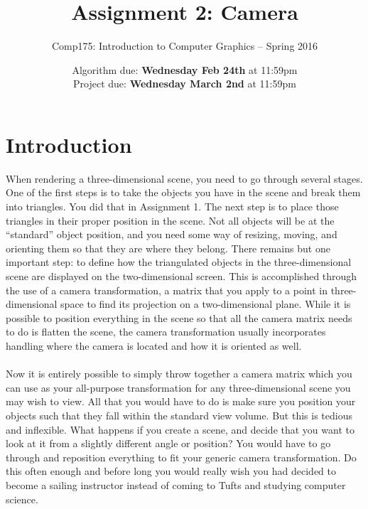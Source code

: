 \documentclass[10pt,twocolumn]{article}
\title{\Huge{\bf Assignment 2: Camera}}
\author{Comp175: Introduction to Computer Graphics -- Spring 2016}
\date{Algorithm due:  {\bf Wednesday Feb 24th} at 11:59pm\\
Project due:  {\bf Wednesday March 2nd} at 11:59pm}
\begin{document}
\maketitle

\section{Introduction}								
When rendering a three-dimensional scene, you need to go through several stages. One of the first steps is to take the objects you have in the scene and break them into triangles. You did that in Assignment 1. The next step is to place those triangles in their proper position in the scene. Not all objects will be at the ``standard'' object position, and you need some way of resizing, moving, and orienting them so that they are where they belong. There remains but one important step: to define how the triangulated objects in the three-dimensional scene are displayed on the two-dimensional screen. This is accomplished through the use of a camera transformation, a matrix that you apply to a point in three-dimensional space to find its projection on a two-dimensional plane. While it is possible to position everything in the scene so that all the camera matrix needs to do is flatten the scene, the camera transformation usually incorporates handling where the camera is located and how it is oriented as well.\\\\
Now it is entirely possible to simply throw together a camera matrix which you can use as your all-purpose transformation for any three-dimensional scene you may wish to view. All that you would have to do is make sure you position your objects such that they fall within the standard view volume. But this is tedious and inflexible. What happens if you create a scene, and decide that you want to look at it from a slightly different angle or position? You would have to go through and reposition everything to fit your generic camera transformation. Do this often enough and before long you would really wish you had decided to become a sailing instructor instead of coming to Tufts and studying computer science.\\\\
\end{document}
